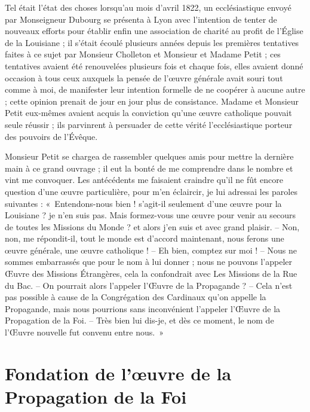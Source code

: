 \documentclass[11pt,a4paper]{report}
\begin{document}
Tel était l'état des choses lorsqu'au mois d'avril 1822, un ecclésiastique envoyé par Monseigneur Dubourg se présenta à Lyon avec l'intention de tenter de nouveaux efforts pour établir enfin une association de charité au profit de l'Église de la Louisiane ; il s'était écoulé plusieurs années depuis les premières tentatives faites à ce sujet par Monsieur Cholleton et Monsieur et Madame Petit ; ces tentatives avaient été renouvelées plusieurs fois et chaque fois, elles avaient donné occasion à tous ceux auxquels la pensée de l'œuvre générale avait souri tout comme à moi, de manifester leur intention formelle de ne coopérer à aucune autre ; cette opinion prenait de jour en jour plus de consistance. Madame et Monsieur Petit eux-mêmes avaient acquis la conviction qu'une œuvre catholique pouvait seule réussir ; ils parvinrent à persuader de cette vérité l'ecclésiastique porteur des pouvoirs de l'Évêque.

Monsieur Petit se chargea de rassembler quelques amis pour mettre la dernière main à ce grand ouvrage ; il eut la bonté de me comprendre dans le nombre et vint me convoquer. Les antécédents me faisaient craindre qu'il ne fût encore question d'une œuvre particulière, pour m'en éclaircir, je lui adressai les paroles suivantes : «~Entendons-nous bien ! s'agit-il seulement d'une œuvre pour la Louisiane ? je n'en suis pas. Mais formez-vous une œuvre pour venir au secours de toutes les Missions du Monde ? et alors j'en suis et avec grand plaisir.
-- Non, non, me répondit-il, tout le monde est d'accord maintenant, nous ferons une œuvre générale, une œuvre catholique !
-- Eh bien, comptez sur moi !
-- Nous ne sommes embarrassés que pour le nom à lui donner ; nous ne pouvons l'appeler Œuvre des Missions Étrangères, cela la confondrait avec Les Missions de la Rue du Bac.
-- On pourrait alors l'appeler l'Œuvre de la Propagande ?
-- Cela n'est pas possible à cause de la Congrégation des Cardinaux qu'on appelle la Propagande, mais nous pourrions sans inconvénient l'appeler l'Œuvre de la Propagation de la Foi.
-- Très bien lui dis-je, et dès ce moment, le nom de l'Œuvre nouvelle fut convenu entre nous.~»

\section*{Fondation de l'œuvre de la Propagation de la Foi}
\end{document}
